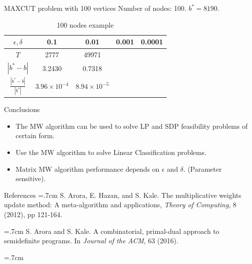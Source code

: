 \documentclass{beamer}
\begin{document}
\begin{frame}{MAXCUT problem with 100 vertices}
Number of nodes: 100. $b^* = 8190$. 
\begin{table}[htbp]\label{100nodestable}
\centering
\begin{tabular}{||c|c|c|c|c||}
\hline
$\epsilon, \delta$ & 0.1 & 0.01 & 0.001 & 0.0001 \\
\hline
$T$ & 2777 & 49971 &  & \\
\hline
$|b^* - b|$ & 3.2430 & 0.7318 &  & \\
\hline
$\frac{|b^* - b|}{|b^*|}$ & $3.96\times 10^{-4}$  & $8.94\times 10^{-5}$ & & \\
\hline
\end{tabular}
\caption{100 nodes example}
\end{table}

\end{frame}

\begin{frame}{Conclusions}
\begin{itemize}
\item The MW algorithm can be used to solve LP and SDP feasibility problems of certain form.
\item 
Use the MW algorithm to solve Linear Classification problems.
\item
Matrix MW algorithm performance depends on $\epsilon$ and $\delta$. (Parameter sensitive).
\end{itemize}
\end{frame}

\begin{frame}{References}
\noindent
\hangindent=.7cm 
S. Arora, E. Hazan, and S. Kale. The multiplicative weights update method: A meta-algorithm and applications, \emph{Theory of Computing}, 8 (2012), pp 121-164.

\vspace{.5cm}
\noindent
\hangindent=.7cm 
S. Arora and S. Kale. A combinatorial, primal-dual approach to semidefinite programs. In \emph{Journal of the ACM}, 63 (2016).

\vspace{.5cm}
\noindent
\hangindent=.7cm 

\end{frame}
\end{document}
